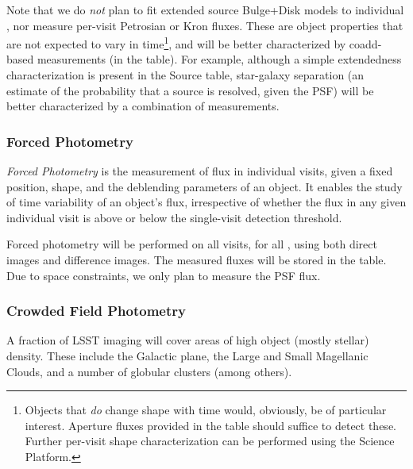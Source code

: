 Note that we do \emph{not} plan to fit extended source Bulge+Disk models to individual \Sources, nor measure per-visit Petrosian or Kron fluxes. These are object properties that are not expected to vary in time\footnote{Objects that \emph{do} change shape with time would, obviously, be of particular interest. Aperture fluxes provided in the \Source table should suffice to detect these. Further per-visit shape characterization can be performed using the Science Platform.}, and will be better characterized by coadd-based measurements (in the \Object table).
For example, although a simple extendedness characterization is present in the Source table, star-galaxy separation (an estimate of the probability that a source is resolved, given the PSF) will be better characterized by a combination of \Object measurements.


\subsubsection{Forced Photometry}
\label{sec:forcedPhotL2}

\emph{Forced Photometry} is the measurement of flux in individual visits, given a fixed position, shape, and the deblending parameters of an object. It enables the study of time variability of an object's flux, irrespective of whether the flux in any given individual visit is above or below the single-visit detection threshold.

Forced photometry will be performed on all visits, for all \Objects, using both direct images and difference images.
The measured fluxes will be stored in the \ForcedSources table. Due to space constraints, we only plan to measure the PSF flux.

\subsubsection{Crowded Field Photometry}

A fraction of LSST imaging will cover areas of high object (mostly stellar) density. These include the Galactic plane, the Large and Small Magellanic Clouds, and a number of globular clusters (among others).


